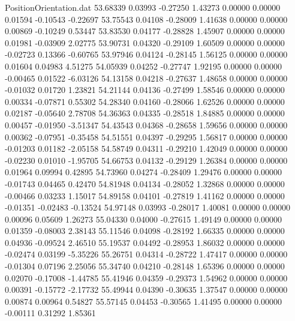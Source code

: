 \begin{filecontents}{PositionOrientation.dat}
  53.68339    0.03993   -0.27250     1.43273    0.00000    0.00000    0.01594   -0.10543   -0.22697
  53.75543    0.04108   -0.28009     1.41638    0.00000    0.00000    0.00869   -0.10249    0.53447
  53.83530    0.04177   -0.28828     1.45907    0.00000    0.00000    0.01981   -0.03909    2.02775
  53.90731    0.04320   -0.29109     1.60509    0.00000    0.00000   -0.02723    0.13366   -0.60765
  53.97946    0.04124   -0.28145     1.56125    0.00000    0.00000    0.01604    0.04983    4.51275
  54.05939    0.04252   -0.27747     1.92195    0.00000    0.00000   -0.00465    0.01522   -6.03126
  54.13158    0.04218   -0.27637     1.48658    0.00000    0.00000   -0.01032    0.01720    1.23821
  54.21144    0.04136   -0.27499     1.58546    0.00000    0.00000    0.00334   -0.07871    0.55302
  54.28340    0.04160   -0.28066     1.62526    0.00000    0.00000    0.02187   -0.05640    2.78708
  54.36363    0.04335   -0.28518     1.84885    0.00000    0.00000    0.00457   -0.01950   -3.51347
  54.43543    0.04368   -0.28658     1.59656    0.00000    0.00000    0.00362   -0.07951   -0.35458
  54.51551    0.04397   -0.29295     1.56817    0.00000    0.00000   -0.01203    0.01182   -2.05158
  54.58749    0.04311   -0.29210     1.42049    0.00000    0.00000   -0.02230    0.01010   -1.95705
  54.66753    0.04132   -0.29129     1.26384    0.00000    0.00000    0.01964    0.09994    0.42895
  54.73960    0.04274   -0.28409     1.29476    0.00000    0.00000   -0.01743    0.04465    0.42470
  54.81948    0.04134   -0.28052     1.32868    0.00000    0.00000   -0.00466    0.03233    1.15017
  54.89158    0.04101   -0.27819     1.41162    0.00000    0.00000   -0.01351   -0.02483   -0.13524
  54.97148    0.03993   -0.28017     1.40081    0.00000    0.00000    0.00096    0.05609    1.26273
  55.04330    0.04000   -0.27615     1.49149    0.00000    0.00000    0.01359   -0.08003    2.38143
  55.11546    0.04098   -0.28192     1.66335    0.00000    0.00000    0.04936   -0.09524    2.46510
  55.19537    0.04492   -0.28953     1.86032    0.00000    0.00000   -0.02474    0.03199   -5.35226
  55.26751    0.04314   -0.28722     1.47417    0.00000    0.00000   -0.01304    0.07196    2.25056
  55.34740    0.04210   -0.28148     1.65396    0.00000    0.00000    0.02070   -0.17008   -1.44785
  55.41946    0.04359   -0.29373     1.54962    0.00000    0.00000    0.00391   -0.15772   -2.17732
  55.49944    0.04390   -0.30635     1.37547    0.00000    0.00000    0.00874    0.00964    0.54827
  55.57145    0.04453   -0.30565     1.41495    0.00000    0.00000   -0.00111    0.31292    1.85361

\end{filecontents}
